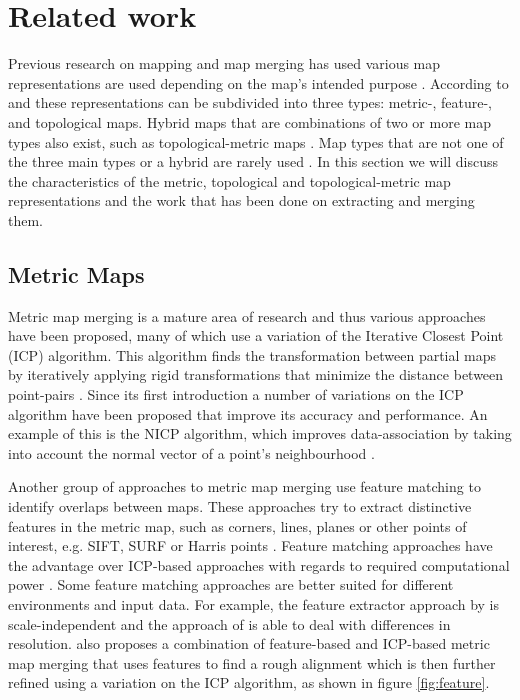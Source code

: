 \section{Related work}
Previous research on mapping and map merging has used various map representations are used depending on the map's intended purpose \citep{tomatis_hybrid_2003,huang_topological_2005,bonanni_3-d_2017,gholamishahbandi_2d_2019}. According to \citet{andersone_heterogeneous_2019} and \citet{yu_review_2020} these representations can be subdivided into three types: metric-, feature-, and topological maps. Hybrid maps that are combinations of two or more map types also exist, such as topological-metric maps \citep{yu_review_2020}. Map types that are not one of the three main types or a hybrid are rarely used \citep{yu_review_2020}. In this section we will discuss the characteristics of the metric, topological and topological-metric map representations and the work that has been done on extracting and merging them.

\subsection{Metric Maps}
\label{section:metric_map_merging}
Metric map merging is a mature area of research and thus various approaches have been proposed, many of which use a variation of the Iterative Closest Point (ICP) algorithm. This algorithm finds the transformation between partial maps by iteratively applying rigid transformations that minimize the distance between point-pairs \citep{rusinkiewicz_efficient_2001}. Since its first introduction a number of variations on the ICP algorithm have been proposed that improve its accuracy and performance. An example of this is the NICP algorithm, which improves data-association by taking into account the normal vector of a point's neighbourhood \citep{serafin_nicp_2015}.  

Another group of approaches to metric map merging use feature matching to identify overlaps between maps. These approaches try to extract distinctive features in the metric map, such as corners, lines, planes or other points of interest, e.g. SIFT, SURF or Harris points \citep{andersone_heterogeneous_2019}. Feature matching approaches have the advantage over ICP-based approaches with regards to required computational power \citep{andersone_heterogeneous_2019}. Some feature matching approaches are better suited for different environments and input data. For example, the feature extractor approach by \citet{li_general_2010} is scale-independent and the approach of \citet{yang_fast_2016} is able to deal with differences in resolution. \citet{yang_fast_2016} also proposes a combination of feature-based and ICP-based metric map merging that uses features to find a rough alignment which is then further refined using a variation on the ICP algorithm, as shown in figure \ref{fig:feature}.

